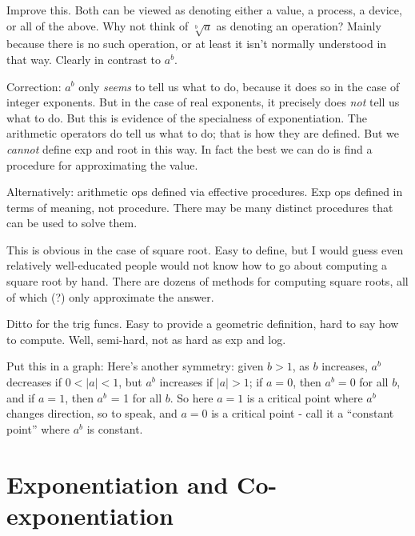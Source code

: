 \begin{remark}
  Improve this.  Both can be viewed as denoting either a value, a
  process, a device, or all of the above.  Why not think of
  $\sqrt[b]{a}$ as denoting an operation?  Mainly because there is no
  such operation, or at least it isn't normally understood in that
  way.  Clearly in contrast to $a^b$.
\end{remark}

\begin{remark}
  Correction: $a^b$ only \textit{seems} to tell us what to do, because
  it does so in the case of integer exponents.  But in the case of
  real exponents, it precisely does \textit{not} tell us what to do.
  But this is evidence of the specialness of exponentiation.  The
  arithmetic operators do tell us what to do; that is how they are
  defined.  But we \textit{cannot} define exp and root in this way.
  In fact the best we can do is find a procedure for approximating the
  value.

  Alternatively: arithmetic ops defined via effective procedures.  Exp
  ops defined in terms of meaning, not procedure.  There may be many
  distinct procedures that can be used to solve them.

  This is obvious in the case of square root.  Easy to define, but I
  would guess even relatively well-educated people would not know how
  to go about computing a square root by hand.  There are dozens of
  methods for computing square roots, all of which (?) only
  approximate the answer.

  Ditto for the trig funcs.  Easy to provide a geometric definition,
  hard to say how to compute.  Well, semi-hard, not as hard as exp and
  log.

\end{remark}


\begin{remark}
  Put this in a graph: Here's another symmetry: given $b>1$, as $b$
  increases, $a^b$ decreases if $0<|a|<1$, but $a^b$ increases if
  $|a|>1$; if $a=0$, then $a^b=0$ for all $b$, and if $a=1$, then
  $a^b$ = 1 for all $b$.  So here $a=1$ is a critical point where
  $a^b$ changes direction, so to speak, and $a=0$ is a critical point
  - call it a ``constant point'' where $a^b$ is constant.

\end{remark}



\section{Exponentiation and Co-exponentiation}

